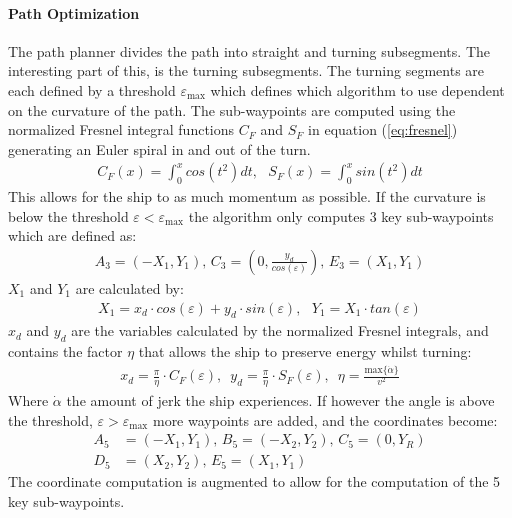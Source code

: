 \documentclass[a0,portrait]{a0poster}
\begin{document}
\begin{center}
{\paragraph{Path Optimization}
The path planner divides the path into straight and turning subsegments. The interesting part of this, is the turning subsegments. The turning segments are each defined by a threshold $\varepsilon_\text{max}$ which defines which algorithm to use dependent on the curvature of the path. The sub-waypoints are computed using the normalized Fresnel integral functions $C_F$ and $S_F$ in equation (\ref{eq:fresnel}) generating an Euler spiral in and out of the turn. 
\begin{align}
C_F(x) = \int_0^x cos(t^2)dt,\,\,\,\,S_F(x) = \int_0^x sin(t^2)dt
\label{eq:fresnel}
\end{align}
This allows for the ship to as much momentum as possible. If the curvature is below the threshold $\varepsilon < \varepsilon_\text{max}$ the algorithm only computes 3 key sub-waypoints which are defined as:
\begin{align}
A_\text{3} = (-X_1,Y_1),\, C_\text{3} = (0,\frac{y_d}{cos(\varepsilon)}),\, E_\text{3} = (X_1,Y_1)
\end{align}
$X_1$ and $Y_1$ are calculated by:
\begin{align}
X_1 = x_d \cdot cos(\varepsilon) + y_d \cdot sin(\varepsilon),\,\,\,\, Y_1 = X_1 \cdot tan(\varepsilon)
\end{align}
$x_d$ and $y_d$ are the variables calculated by the normalized Fresnel integrals, and contains the factor $\eta$ that allows the ship to preserve energy whilst turning:
\begin{align}
x_d = \frac{\pi}{\eta}\cdot C_F(\varepsilon),\,\,\, y_d = \frac{\pi}{\eta}\cdot S_F(\varepsilon),\,\,\, \eta = \frac{\text{max}\{\dot{\alpha}\}}{v^2}
\end{align}
Where $\dot{\alpha}$ the amount of jerk the ship experiences. If however the angle is above the threshold, $\varepsilon > \varepsilon_\text{max}$ more waypoints are added, and the coordinates become:
\begin{align}
A_\text{5} &= (-X_1,Y_1),\, B_\text{5} = (-X_2,Y_2),\, C_\text{5} = (0,Y_R)\\
D_\text{5} &= (X_2,Y_2),\, E_\text{5} = (X_1,Y_1)
\end{align}
The coordinate computation is augmented to allow for the computation of the 5 key sub-waypoints.
\begin{align}

\end{align}

}
\end{center}
\end{document}
